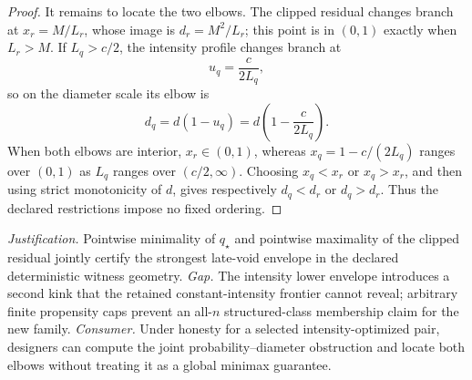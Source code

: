 \documentclass{article}
\begin{document}
\begin{proof}
It remains to locate the two elbows.  The clipped residual changes branch at \(x_r=M/L_r\), whose image is \(d_r=M^2/L_r\); this point is in \((0,1)\) exactly when \(L_r>M\).  If \(L_q>c/2\), the intensity profile changes branch at
\[
 u_q=\frac{c}{2L_q},
\]
so on the diameter scale its elbow is
\[
 d_q=d(1-u_q)=d\!\left(1-\frac{c}{2L_q}\right).
\]
When both elbows are interior, \(x_r\in(0,1)\), whereas \(x_q=1-c/(2L_q)\) ranges over \((0,1)\) as \(L_q\) ranges over \((c/2,\infty)\).  Choosing \(x_q<x_r\) or \(x_q>x_r\), and then using strict monotonicity of \(d\), gives respectively \(d_q<d_r\) or \(d_q>d_r\).  Thus the declared restrictions impose no fixed ordering.
\end{proof}
\par\smallskip\noindent \textit{Justification.} Pointwise minimality of \(q_\star\) and pointwise maximality of the clipped residual jointly certify the strongest late-void envelope in the declared deterministic witness geometry. \textit{Gap.} The intensity lower envelope introduces a second kink that the retained constant-intensity frontier cannot reveal; arbitrary finite propensity caps prevent an all-\(n\) structured-class membership claim for the new family. \textit{Consumer.} Under honesty for a selected intensity-optimized pair, designers can compute the joint probability--diameter obstruction and locate both elbows without treating it as a global minimax guarantee.
\end{document}

